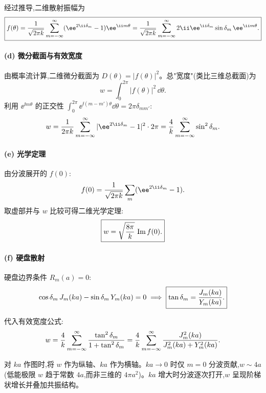 \begin{solution}
经过推导,二维散射振幅为
\[
\boxed{f(\theta)={1\over\sqrt{2\pi k}}\sum_{m=-\infty}^{\infty}(\ee^{2\ii\delta_m}-1)\ee^{\ii m\theta}
={1\over\sqrt{2\pi k}}\sum_{m=-\infty}^{\infty}2\ii \ee^{\ii\delta_m}\sin\delta_m\,\ee^{\ii m\theta}.}
\]

\paragraph{(d) 微分截面与有效宽度}

由概率流计算,二维微分截面为 $D(\theta)=|f(\theta)|^2$。总"宽度"(类比三维总截面)为
\[
w=\int_0^{2\pi}|f(\theta)|^2\,\dd\theta.
\]
利用 $\ee^{\ii m\theta}$ 的正交性 $\int_0^{2\pi}\ee^{\ii(m-m')\theta}\dd\theta=2\pi\delta_{mm'}$:
\[
w={1\over2\pi k}\sum_{m=-\infty}^{\infty}|\ee^{2\ii\delta_m}-1|^2\cdot2\pi
={4\over k}\sum_{m=-\infty}^{\infty}\sin^2\delta_m.
\]

\paragraph{(e) 光学定理}

由分波展开的 $f(0)$:
\[
f(0)={1\over\sqrt{2\pi k}}\sum_m(\ee^{2\ii\delta_m}-1).
\]
取虚部并与 $w$ 比较可得二维光学定理:
\[
\boxed{w=\sqrt{8\pi\over k}\,\operatorname{Im}f(0).}
\]

\paragraph{(f) 硬盘散射}

硬盘边界条件 $R_m(a)=0$:
\[
\cos\delta_m\,J_m(ka)-\sin\delta_m\,Y_m(ka)=0
\;\Longrightarrow\;
\boxed{\tan\delta_m={J_m(ka)\over Y_m(ka)}.}
\]

代入有效宽度公式:
\[
w={4\over k}\sum_{m=-\infty}^{\infty}{\tan^2\delta_m\over1+\tan^2\delta_m}
={4\over k}\sum_{m=-\infty}^{\infty}{J_m^2(ka)\over J_m^2(ka)+Y_m^2(ka)}.
\]

对 $ka$ 作图时,将 $w$ 作为纵轴、$ka$ 作为横轴。$ka\to0$ 时仅 $m=0$ 分波贡献,$w\sim4a$(低能极限 $w$ 趋于常数 $4a$,而非三维的 $4\pi a^2$)。$ka$ 增大时分波逐次打开,$w$ 呈现阶梯状增长并叠加共振结构。
\end{solution}

